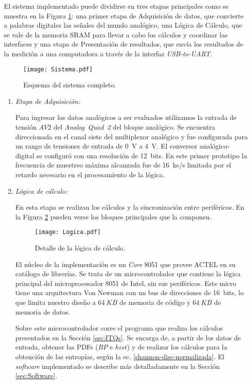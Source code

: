 El sistema implementado puede dividirse en tres etapas principales como se muestra en la Figura \ref{Fig:Sistema}: una primer etapa de Adquisición de datos, que convierte a palabras digitales las señales del mundo analógico, una Lógica de Cálculo, que se vale de la memoria SRAM para llevar a cabo los cálculos y coordinar las interfaces y una etapa de Presentación de resultados, que envía los resultados de la medición a una computadora a través de la interfaz \textit{USB-to-UART}.
%
\begin{figure}
	\centering
	\texttt{[image: Sistema.pdf]}\\
	\caption{Esquema del sistema completo.}\label{Fig:Sistema}
\end{figure}

\begin{enumerate}
	\item \textit{Etapa de Adquisición:}
	
	Para ingresar los datos analógicos a ser evaluados utilizamos la entrada de tensión $AV2$ del \textit{Analog~Quad~2} del bloque analógico.
	Se encuentra direccionada en el canal siete del multiplexor analógico y fue configurada para un rango de tensiones de entrada de 0~V a 4~V.
	El conversor analógico-digital se configuró con una resolución de 12~bits.
	En este primer prototipo la frecuencia de muestreo máxima alcanzada fue de 16~ks/s limitada por el retardo necesario en el procesamiento de la lógica.
	
	\item \textit{Lógica de cálculo:}
	
	En esta etapa se realizan los cálculos y la sincronización entre periféricos.
	En la Figura \ref{fig:logica} pueden verse los bloques principales que la componen.
	\begin{figure}
		\centering
		\texttt{[image: Logica.pdf]}\\
		\caption{Detalle de la lógica de cálculo.}\label{fig:logica}
	\end{figure}
	
	El núcleo de la implementación es un \textit{Core} 8051 que provee ACTEL en su catálogo de librerías.
	Se trata de un microcontrolador que contiene la lógica principal del microprocesador 8051 de Intel, sin sus periféricos.
	Este micro tiene una arquitectura Von Newman con un bus de direcciones de 16~bits, lo que limita nuestro diseño a $64~KB$ de memoria de código y $64~KB$ de memoria de datos.
	
	Sobre este microcontrolador corre el programa que realiza los cálculos presentados en la Sección \ref{sec:ITQs}.
	Se encarga de, a partir de los datos de entrada, obtener las PDFs ($BP$ e $hist$) y de realizar los cálculos para la obtención de las entropías, según la ec. \ref{shannon-disc-normalizada}.
	El \textit{software} implementado se describe más detalladamente en la Sección \ref{sec:Software}.
	

\end{enumerate}
